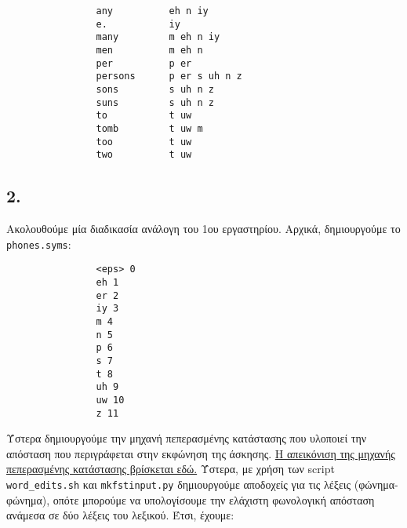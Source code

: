 \documentclass[12pt,a4paper]{article}
\begin{document}
			\begin{verbatim}
				any          eh n iy
				e.           iy
				many         m eh n iy
				men          m eh n
				per          p er
				persons      p er s uh n z
				sons         s uh n z
				suns         s uh n z
				to           t uw
				tomb         t uw m
				too          t uw
				two          t uw
			\end{verbatim}
		
		\subsection*{2.}
			Ακολουθούμε μία διαδικασία ανάλογη του 1ου εργαστηρίου. Αρχικά, δημιουργούμε το \verb|phones.syms|:
			
			\begin{verbatim}
				<eps> 0
				eh 1
				er 2
				iy 3
				m 4
				n 5
				p 6
				s 7
				t 8
				uh 9
				uw 10
				z 11
			\end{verbatim}
			
			Ύστερα δημιουργούμε την μηχανή πεπερασμένης κατάστασης που υλοποιεί την απόσταση που περιγράφεται στην εκφώνηση της άσκησης. \href{https://imgur.com/a/S3IAVKw}{Η απεικόνιση της μηχανής πεπερασμένης κατάστασης βρίσκεται εδώ.} Ύστερα, με χρήση των script \verb|word_edits.sh| και \verb|mkfstinput.py| δημιουργούμε αποδοχείς για τις λέξεις (φώνημα-φώνημα), οπότε μπορούμε να υπολογίσουμε την ελάχιστη φωνολογική απόσταση ανάμεσα σε δύο λέξεις του λεξικού. Έτσι, έχουμε:
			
\end{document}
